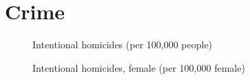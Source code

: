 \documentclass[
  ignorenonframetext,
]{beamer}
\begin{document}
\section{Crime}\label{crime}

\begin{frame}{}
\label{section-7}
\begin{figure}


\caption{\label{fig-intentional-homicides-col}Intentional homicides (per
100,000 people)}

\end{figure}%
\end{frame}

\begin{frame}{}
\label{section-8}
\begin{figure}


\caption{\label{fig-intentional-homicides-female-col}Intentional
homicides, female (per 100,000 female)}

\end{figure}%
\end{frame}
\end{document}
